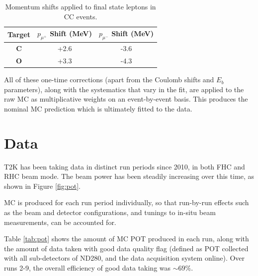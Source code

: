 \begin{itemize}
\begin{center}
\begin{table}
\center
\begin{tabular}{ c||c|c}
\hline
\hline
\textbf{Target} & \textbf{$p_{\mu^{+}}$ Shift (MeV)} & \textbf{$p_{\mu^{-}}$ Shift (MeV)} \\
\hline
\hline
\textbf{C} & +2.6 & -3.6\\
\textbf{O} & +3.3 & -4.3\\ 
\hline
\hline
\end{tabular}
\caption{Momentum shifts applied to final state leptons in CC events.}
\label{tab:coulomb}
\end{table}
\end{center}

\end{itemize}

All of these one-time corrections (apart from the Coulomb shifts and $E_{b}$ parameters), along with the systematics that vary in the fit, are applied to the raw MC as multiplicative weights on an event-by-event basis. This produces the nominal MC prediction which is ultimately fitted to the data.

\section{Data}\label{sec:data}

T2K has been taking data in distinct run periods since 2010, in both FHC and RHC beam mode. The beam power has been steadily increasing over this time, as shown in Figure \ref{fig:pot}.

MC is produced for each run period individually, so that run-by-run effects such as the beam and detector configurations, and tunings to in-situ beam measurements, can be accounted for.

Table \ref{tab:pot} shows the amount of MC POT produced in each run, along with the amount of data taken with good data quality flag (defined as POT collected with all sub-detectors of ND280, and the data acquisition system online). Over runs 2-9, the overall efficiency of good data taking was $\sim69\%$.

